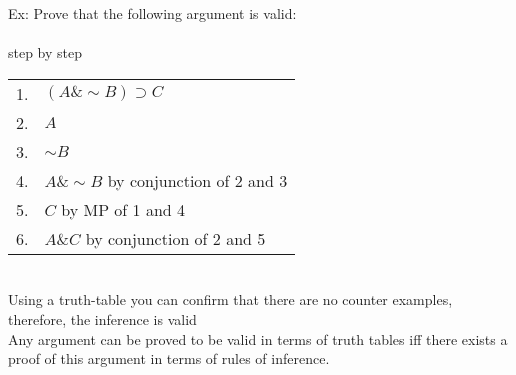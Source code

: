  Ex: Prove that the following argument is valid:\\
 \\
 step by step\\
\begin{tabular}{cl}
    1. & $(A\&\sim B)\supset C$\\
    2. & $A$\\
    3. & $\sim B$\\
    \hline
    4. & $A\& \sim B$ by conjunction of 2 and 3\\
    5. & $C$ by MP of 1 and 4\\
    6. & $A\& C$ by conjunction of 2 and 5
\end{tabular}\\
Using a truth-table you can confirm that there are no counter examples, therefore, the inference is valid\\
Any argument can be proved to be valid in terms of truth tables iff there exists a proof of this argument in terms of rules of inference.\\

